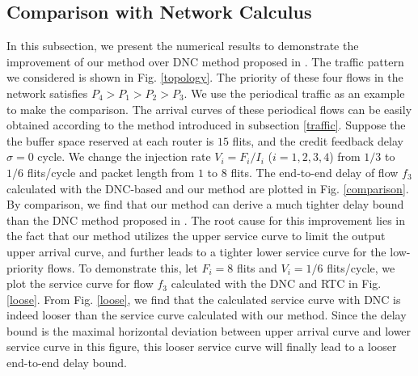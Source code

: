 \documentclass[preprint]{elsarticle}
\begin{document}
\subsection{Comparison with Network Calculus}\label{dnccmp}
In this subsection, we present the numerical results to demonstrate the improvement of our method over DNC method proposed in \cite{Qian489900}. The traffic pattern we considered is shown in Fig. \ref{topology}. The priority of these four flows in the network satisfies $P_4>P_1>P_2>P_3$. We use the periodical traffic as an example to make the comparison. The arrival curves of these periodical flows can be easily obtained according to the method introduced in subsection \ref{traffic}. Suppose the the buffer space reserved at each router is $15$ flits, and the credit feedback delay $\sigma=0$ cycle. We change the injection rate $V_i=F_i/I_i$ ($i=1,2,3,4$) from $1/3$ to $1/6$ flits/cycle and packet length from $1$ to $8$ flits. The end-to-end delay of flow $f_3$ calculated with the DNC-based and our method are plotted in Fig. \ref{comparison}. By comparison, we find that our method can derive a much tighter delay bound than the DNC method proposed in \cite{Qian489900}. The root cause for this improvement lies in the fact that our method utilizes the upper service curve to limit the output upper arrival curve, and further leads to a tighter lower service curve for the low-priority flows. To demonstrate this, let $F_i=8$ flits and $V_i=1/6$ flits/cycle, we plot the service curve for flow $f_3$ calculated with the DNC and RTC in Fig. \ref{loose}. From Fig. \ref{loose}, we find that the calculated service curve with DNC is indeed looser than the service curve calculated with our method. Since the delay bound is the maximal horizontal deviation between upper arrival curve and lower service curve in this figure, this looser service curve will finally lead to a looser end-to-end delay bound.
\end{document}
